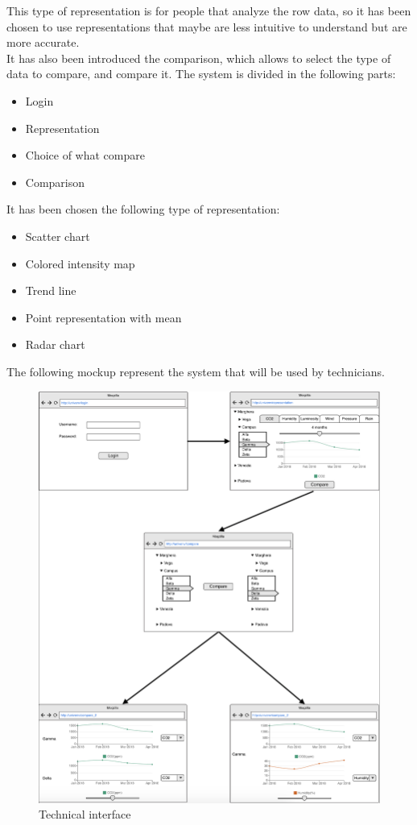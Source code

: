 \documentclass[12pt]{article} %
\begin{document}
This type of representation is for people that analyze the row data, so it has been chosen to use representations that maybe are less intuitive to understand but are more accurate. \\ It has also been introduced the comparison, which allows to select the type of data to compare, and compare it.
The system is divided in the following parts: 
\begin{itemize}
\item Login
\item Representation
\item Choice of what compare  
\item Comparison
\end{itemize}
It has been chosen the following type of representation: 
\begin{itemize}
\item Scatter chart
\item Colored intensity map
\item Trend line
\item Point representation with mean
\item Radar chart
\end{itemize}
The following mockup represent the system that will be used by technicians.\\
\begin{figure}[H]
  \centering
  \includegraphics[width=1\textwidth]{img/tot.png}
  \caption{Technical interface}
  \label{fig:boat1}
\end{figure}
\end{document}
